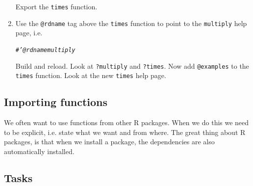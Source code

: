 \documentclass[a4paper,justified,openany]{tufte-handout}\usepackage[]{graphicx}\usepackage[]{color}
\makeatletter
\newcommand{\hlcom}[1]{\textcolor[rgb]{0.678,0.584,0.686}{\textit{#1}}}%
\newenvironment{kframe}{%
 \def\at@end@of@kframe{}%
 \ifinner\ifhmode%
  \def\at@end@of@kframe{\end{minipage}}%
  \begin{minipage}{\columnwidth}%
 \fi\fi%
 \def\FrameCommand##1{\hskip\@totalleftmargin \hskip-\fboxsep
 \colorbox{shadecolor}{##1}\hskip-\fboxsep
     \hskip-\linewidth \hskip-\@totalleftmargin \hskip\columnwidth}%
 \MakeFramed {\advance\hsize-\width
   \@totalleftmargin\z@ \linewidth\hsize
   \@setminipage}}%
 {\par\unskip\endMakeFramed%
 \at@end@of@kframe}
\newenvironment{knitrout}{}{} %
\newcommand{\cc}{\texttt}
\makeatother
\begin{document}
\begin{enumerate}
\begin{knitrout}
\end{knitrout}
\noindent Export the \cc{times} function.
\item Use the \cc{@rdname} tag above the \cc{times} function to point to the \cc{multiply} help page, i.e.
\begin{knitrout}
\color{fgcolor}\begin{kframe}
\begin{alltt}
\hlcom{#' @rdname multiply}
\end{alltt}
\end{kframe}
\end{knitrout}
\noindent Build and reload. Look at \cc{?multiply} and \cc{?times}. Now add
\cc{@examples} to the \cc{times} function. Look at the new \cc{times} help page.
\end{enumerate}

\subsection{Importing functions}

We often want to use functions from other R packages. When we do this we need to
be explicit, i.e. state what we want and from where. The great thing about R
packages, is that when we install a package, the dependencies are also
automatically installed.

\subsection*{Tasks}
\end{document}
